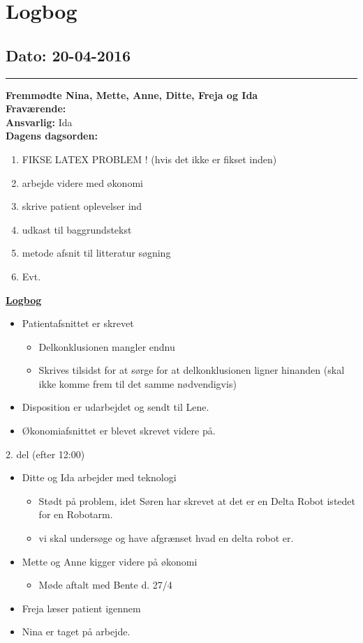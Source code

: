 \chapter{Logbog}
\section{Dato: 20-04-2016}
\hrule
\textbf{Fremmødte Nina, Mette, Anne, Ditte, Freja og Ida } \\
\textbf{Fraværende: } \\
\textbf{Ansvarlig:} Ida  \\
\textbf{Dagens dagsorden: }
\begin{enumerate}
	\item FIKSE LATEX PROBLEM ! (hvis det ikke er fikset inden)
	\item arbejde videre med økonomi
	\item skrive patient oplevelser ind
	\item udkast til baggrundstekst
	\item metode afsnit til litteratur søgning
	\item Evt. 
\end{enumerate}

\underline{\textbf{Logbog}}
\begin{itemize}
\item Patientafsnittet er skrevet
\begin{itemize}
\item Delkonklusionen mangler endnu 
\item Skrives tilsidst for at sørge for at delkonklusionen ligner hinanden (skal ikke komme frem til det samme nødvendigvis)
\end{itemize}
\item Disposition er udarbejdet og sendt til Lene.
\item Økonomiafsnittet er blevet skrevet videre på.
\end{itemize}
2. del (efter 12:00)
\begin{itemize}
\item Ditte og Ida arbejder med teknologi
\begin{itemize}
\item Stødt på problem, idet Søren har skrevet at det er en Delta Robot istedet for en Robotarm.
\item vi skal undersøge og have afgrænset hvad en delta robot er.
\end{itemize}
\item Mette og Anne kigger videre på økonomi
\begin{itemize}
\item Møde aftalt med Bente d. 27/4
\end{itemize}
\item Freja læser patient igennem
\item Nina er taget på arbejde.
\end{itemize}
\newpage